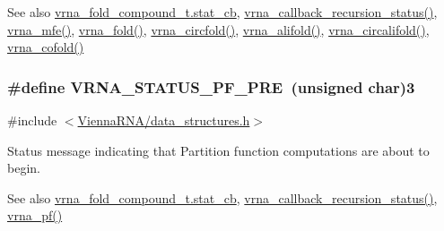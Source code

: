 \begin{DoxySeeAlso}{See also}
\hyperlink{group__fold__compound_a87a83f6795b569000efcbe65acc3dd81}{vrna\+\_\+fold\+\_\+compound\+\_\+t.\+stat\+\_\+cb}, \hyperlink{group__fold__compound_ga4a4a0d838de6d18315bafc84f93f5cc0}{vrna\+\_\+callback\+\_\+recursion\+\_\+status()}, \hyperlink{group__mfe__fold_gabd3b147371ccf25c577f88bbbaf159fd}{vrna\+\_\+mfe()}, \hyperlink{group__mfe__fold__single_ga29a33b2895f4e67b0480271ff289afdc}{vrna\+\_\+fold()}, \hyperlink{group__mfe__fold__single_gaf973483d8acbc8cc9aacfc8a9b7f0074}{vrna\+\_\+circfold()}, \hyperlink{group__consensus__mfe__fold_ga6c9d3bef3e92c6d423ffac9f981418c1}{vrna\+\_\+alifold()}, \hyperlink{group__consensus__mfe__fold_ga17a1be7490468c29c335ba9bffacba53}{vrna\+\_\+circalifold()}, \hyperlink{group__mfe__cofold_ga9ef3a297201dbf838a8daff2b45c0c82}{vrna\+\_\+cofold()} 
\end{DoxySeeAlso}
\subsubsection[{\texorpdfstring{V\+R\+N\+A\+\_\+\+S\+T\+A\+T\+U\+S\+\_\+\+P\+F\+\_\+\+P\+RE}{VRNA_STATUS_PF_PRE}}]{\setlength{\rightskip}{0pt plus 5cm}\#define V\+R\+N\+A\+\_\+\+S\+T\+A\+T\+U\+S\+\_\+\+P\+F\+\_\+\+P\+RE~(unsigned char)3}\hypertarget{group__fold__compound_ga91795d35ebdb6f32be50459f24b3d114}{}\label{group__fold__compound_ga91795d35ebdb6f32be50459f24b3d114}


{\ttfamily \#include $<$\hyperlink{data__structures_8h}{Vienna\+R\+N\+A/data\+\_\+structures.\+h}$>$}



Status message indicating that Partition function computations are about to begin. 

\begin{DoxySeeAlso}{See also}
\hyperlink{group__fold__compound_a87a83f6795b569000efcbe65acc3dd81}{vrna\+\_\+fold\+\_\+compound\+\_\+t.\+stat\+\_\+cb}, \hyperlink{group__fold__compound_ga4a4a0d838de6d18315bafc84f93f5cc0}{vrna\+\_\+callback\+\_\+recursion\+\_\+status()}, \hyperlink{group__pf__fold_ga29e256d688ad221b78d37f427e0e99bc}{vrna\+\_\+pf()} 
\end{DoxySeeAlso}

